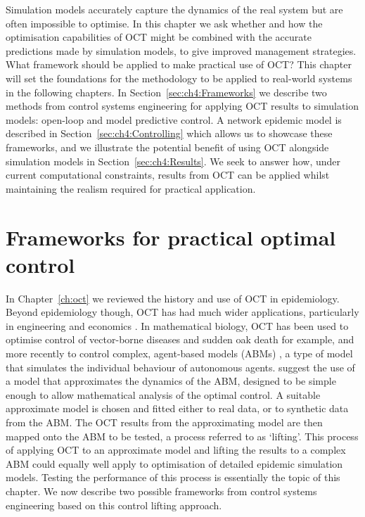\newpage
Simulation models accurately capture the dynamics of the real system but are often impossible to optimise. In this chapter we ask whether and how the optimisation capabilities of OCT might be combined with the accurate predictions made by simulation models, to give improved management strategies. What framework should be applied to make practical use of OCT? This chapter will set the foundations for the methodology to be applied to real-world systems in the following chapters. In Section~\ref{sec:ch4:Frameworks} we describe two methods from control systems engineering for applying OCT results to simulation models: open-loop and model predictive control. A network epidemic model is described in Section~\ref{sec:ch4:Controlling} which allows us to showcase these frameworks, and we illustrate the potential benefit of using OCT alongside simulation models in Section~\ref{sec:ch4:Results}. We seek to answer how, under current computational constraints, results from OCT can be applied whilst maintaining the realism required for practical application.

\section{Frameworks for practical optimal control\label{sec:ch4:Frameworks}}

In Chapter~\ref{ch:oct} we reviewed the history and use of OCT in epidemiology. Beyond epidemiology though, OCT has had much wider applications, particularly in engineering and economics \citep{bertsekas_dynamic_2001}. In mathematical biology, OCT has been used to optimise control of vector-borne diseases \citep{blayneh_optimal_2009} and sudden oak death \citep{ndeffo_mbah_balancing_2010} for example, and more recently to control complex, agent-based models (ABMs) \citep{an_optimization_2017}, a type of model that simulates the individual behaviour of autonomous agents. \citet{an_optimization_2017} suggest the use of a model that approximates the dynamics of the ABM, designed to be simple enough to allow mathematical analysis of the optimal control. A suitable approximate model is chosen and fitted either to real data, or to synthetic data from the ABM\@. The OCT results from the approximating model are then mapped onto the ABM to be tested, a process referred to as `lifting'. This process of applying OCT to an approximate model and lifting the results to a complex ABM could equally well apply to optimisation of detailed epidemic simulation models. Testing the performance of this process is essentially the topic of this chapter. We now describe two possible frameworks from control systems engineering based on this control lifting approach.

